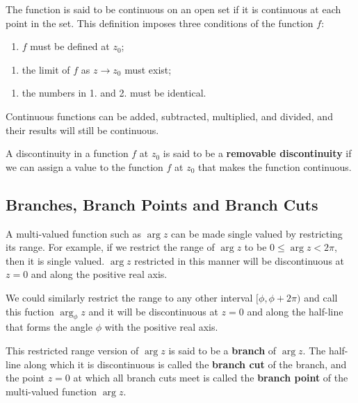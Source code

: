 \documentclass{article}
\begin{document}
The function is said to be continuous on an \@{open} set if it is continuous at each point in the set. This definition imposes three conditions of the function $f$:

\begin{enumerate}
\item $f$ must be defined at $z_0$;
\end{enumerate}

\begin{enumerate}
\item the limit of $f$ as $z \to z_0$ must exist;
\end{enumerate}

\begin{enumerate}
\item the numbers in 1. and 2. must be identical.
\end{enumerate}

\@{Continuous} functions can be added, subtracted, multiplied, and divided, and their results will still be continuous.

A discontinuity in a function $f$ at $z_0$ is said to be a \textbf{removable discontinuity} if we can assign a value to the function $f$ at $z_0$ that makes the function continuous.

\subsection{Branches, Branch Points and Branch Cuts}

A multi-valued function such as $\arg{z}$ can be made single valued by restricting its \@{range}. For example, if we restrict the range of $\arg{z}$ to be $0 \le \arg{z} < 2 \pi$, then it is single valued. $\arg{z}$ restricted in this manner will be discontinuous at $z = 0$ and along the positive real axis.

We could similarly restrict the range to any other interval $[\phi, \phi + 2 \pi)$ and call this fuction $\arg_{\phi}{z}$ and it will be discontinuous at $z = 0$ and along the half-line that forms the angle $\phi$ with the positive real axis.

This restricted range version of $\arg{z}$ is said to be a \textbf{branch} of $\arg{z}$. The half-line along which it is discontinuous is called the \textbf{branch cut} of the branch, and the point $z = 0$ at which all branch cuts meet is called the \textbf{branch point} of the multi-valued function $\arg{z}$.
\end{document}
